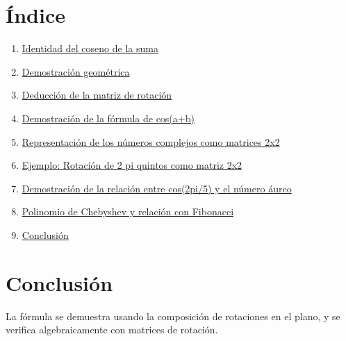 \documentclass{article}
\begin{document}
\section*{Índice}
\begin{enumerate}
  \item \hyperref[sec:identidad]{Identidad del coseno de la suma}
  \item \hyperref[sec:geom]{Demostración geométrica}
  \item \hyperref[sec:rotacion]{Deducción de la matriz de rotación}
  \item \hyperref[sec:demcos]{Demostración de la fórmula de cos(a+b)}
  \item \hyperref[sec:complejos]{Representación de los números complejos como matrices 2x2}
  \item \hyperref[sec:ejemplo]{Ejemplo: Rotación de 2 pi quintos como matriz 2x2}
  \item \hyperref[sec:cosenoaureo]{Demostración de la relación entre cos(2pi/5) y el número áureo}
  \item \hyperref[sec:chebfib]{Polinomio de Chebyshev y relación con Fibonacci}
  \item \hyperref[sec:conclusion]{Conclusión}
\end{enumerate}












\section{Conclusión}\label{sec:conclusion}
La fórmula se demuestra usando la composición de rotaciones en el plano, y se verifica algebraicamente con matrices de rotación.
\end{document}
